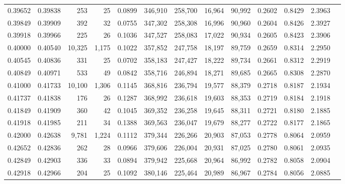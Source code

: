 \begin{tabular}{rrrrrrrrrrrrr}
0.39652 & 0.39838 &    253 &    25 &                                     0.0899 & 346,910 & 258,700 &  16,964 &  90,992 & 0.2602 & 0.8429 & 2.3963 \\
0.39849 & 0.39909 &    392 &    32 &                                     0.0755 & 347,302 & 258,308 &  16,996 &  90,960 & 0.2604 & 0.8426 & 2.3927 \\
0.39918 & 0.39966 &    225 &    26 &                                     0.1036 & 347,527 & 258,083 &  17,022 &  90,934 & 0.2605 & 0.8423 & 2.3906 \\
0.40000 & 0.40540 & 10,325 & 1,175 &                                     0.1022 & 357,852 & 247,758 &  18,197 &  89,759 & 0.2659 & 0.8314 & 2.2950 \\
0.40545 & 0.40836 &    331 &    25 &                                     0.0702 & 358,183 & 247,427 &  18,222 &  89,734 & 0.2661 & 0.8312 & 2.2919 \\
0.40849 & 0.40971 &    533 &    49 &                                     0.0842 & 358,716 & 246,894 &  18,271 &  89,685 & 0.2665 & 0.8308 & 2.2870 \\
0.41000 & 0.41733 & 10,100 & 1,306 &                                     0.1145 & 368,816 & 236,794 &  19,577 &  88,379 & 0.2718 & 0.8187 & 2.1934 \\
0.41737 & 0.41838 &    176 &    26 &                                     0.1287 & 368,992 & 236,618 &  19,603 &  88,353 & 0.2719 & 0.8184 & 2.1918 \\
0.41849 & 0.41909 &    360 &    42 &                                     0.1045 & 369,352 & 236,258 &  19,645 &  88,311 & 0.2721 & 0.8180 & 2.1885 \\
0.41918 & 0.41985 &    211 &    34 &                                     0.1388 & 369,563 & 236,047 &  19,679 &  88,277 & 0.2722 & 0.8177 & 2.1865 \\
0.42000 & 0.42638 &  9,781 & 1,224 &                                     0.1112 & 379,344 & 226,266 &  20,903 &  87,053 & 0.2778 & 0.8064 & 2.0959 \\
0.42652 & 0.42836 &    262 &    28 &                                     0.0966 & 379,606 & 226,004 &  20,931 &  87,025 & 0.2780 & 0.8061 & 2.0935 \\
0.42849 & 0.42903 &    336 &    33 &                                     0.0894 & 379,942 & 225,668 &  20,964 &  86,992 & 0.2782 & 0.8058 & 2.0904 \\
0.42918 & 0.42966 &    204 &    25 &                                     0.1092 & 380,146 & 225,464 &  20,989 &  86,967 & 0.2784 & 0.8056 & 2.0885 \\

\end{tabular}

